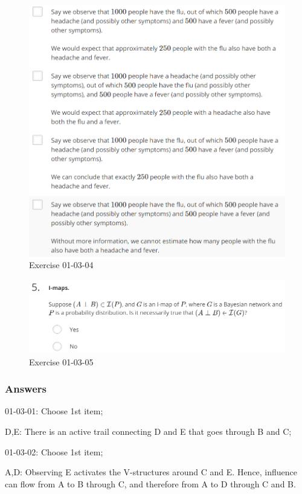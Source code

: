 \documentclass[12pt]{article}
\numberwithin{equation}{section}
\begin{document}
\begin{figure}[H]
	\includegraphics[width=\linewidth]{PGMpics/01-03-04-2.png}
	\caption{Exercise 01-03-04}
	\label{fig:01-03-04-2}
\end{figure}
\begin{figure}[H]
	\includegraphics[width=\linewidth]{PGMpics/01-03-05.png}
	\caption{Exercise 01-03-05}
	\label{fig:01-03-05}
\end{figure}
\subsubsection{Answers}
01-03-01: Choose 1st item; 

D,E: There is an active trail connecting D and E that goes through B and C; 

01-03-02: Choose 1st item;

A,D: Observing E activates the V-structures around C and E. Hence, influence can flow from A to B through C, and therefore from A to D through C and B.
\end{document}
